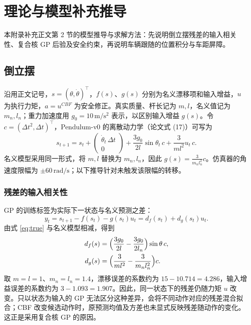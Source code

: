 \documentclass[UTF8,a4paper,zihao=-4,fontset=fandol]{ctexart}
\begin{document}
\nocite{*}

\printbibliography[heading=bibintoc,title={参考文献}]

\appendix
{}

\section{理论与模型补充推导}
\label{app:theory}
本附录补充正文第 2 节的模型推导与求解方法：先说明倒立摆残差的输入相关性、复合核 GP 后验及安全约束，再说明车辆跟随的位置积分与车距屏障。

\subsection{倒立摆}
\label{app:theory-pend}

沿用正文记号，$s=(\theta,\dot\theta)^\top$，$f(s)$、$g(s)$ 分别为名义漂移项和输入增益，$u$ 为执行力矩，$a=u^{CBF}$ 为安全修正。真实质量、杆长记为 $m,l$，名义值记为 $m_n,l_n$；重力加速度用 $g_0=10\,\mathrm{m/s^2}$ 表示，以区别输入增益 $g(s)$。令 $c=(\Delta t^2,\Delta t)^\top$，Pendulum-v0 的离散动力学（论文式 (17)）可写为
\begin{equation}
s_{t+1}=s_t+\begin{pmatrix}\dot\theta_t\,\Delta t\\0\end{pmatrix}
+\frac{3g_0}{2l}\sin\theta_t\,c+\frac{3}{ml^2}u_t\,c.
\label{eq:true}
\end{equation}
名义模型采用同一形式，将 $m,l$ 替换为 $m_n,l_n$，因此 $g(s)=\tfrac{3}{m_nl_n^2}c$。仿真器的角速度限幅为 $\pm60\,\mathrm{rad/s}$；以下推导针对未触发该限幅的转移。

\subsubsection{残差的输入相关性}
GP 的训练标签为实际下一状态与名义预测之差：
\begin{equation}
y_t=s_{t+1}-f(s_t)-g(s_t)u_t=d_f(s_t)+d_g(s_t)u_t.
\end{equation}
由式 \eqref{eq:true} 与名义模型相减，得到
\[
\begin{aligned}
d_f(s)&=\Bigl(\frac{3g_0}{2l}-\frac{3g_0}{2l_n}\Bigr)\sin\theta\,c,\\
d_g(s)&=\Bigl(\frac{3}{ml^2}-\frac{3}{m_nl_n^2}\Bigr)c.
\end{aligned}
\]
取 $m=l=1$、$m_n=l_n=1.4$，漂移误差的系数约为 $15-10.714=4.286$，输入增益误差的系数约为 $3-1.093=1.907$。因此，同一状态下的残差仍随力矩 $u$ 改变。只以状态为输入的 GP 无法区分这种差异，会将不同动作对应的残差混合拟合；CBF 改变候选动作时，原预测均值及方差也未显式反映残差随动作的变化。这正是采用复合核 GP 的原因。
\end{document}
